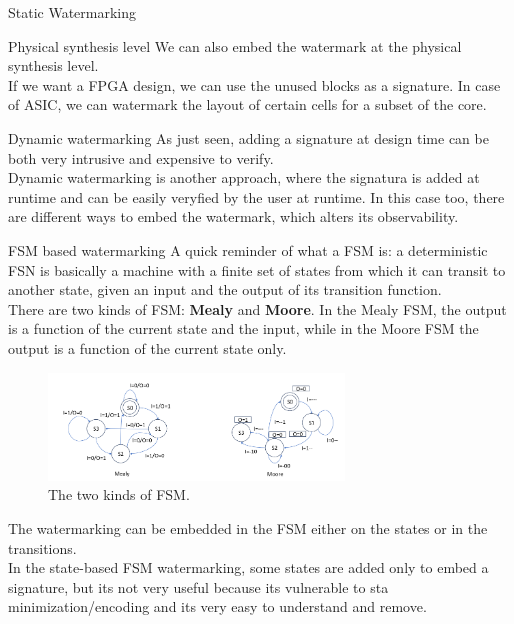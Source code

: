 \begin{section}{Static Watermarking}
  \begin{subsection}{Physical synthesis level}
    We can also embed the watermark at the physical synthesis level.\\
    If we want a FPGA design, we can use the unused blocks as a signature. In case of ASIC, we can watermark
    the layout of certain cells for a subset of the core.
  \end{subsection}
\end{section}

\begin{section}{Dynamic watermarking}
  As just seen, adding a signature at design time can be both very intrusive and expensive to verify.\\
  Dynamic watermarking is another approach, where the signatura is added at runtime and can be easily
  veryfied by the user at runtime. In this case too, there are different ways to embed the watermark,
  which alters its observability.
  \begin{subsection}{FSM based watermarking}
    A quick reminder of what a FSM is: a deterministic FSN is basically a machine with a finite set 
    of states from which it can transit to another state, given an input and the output of its transition
    function.\\
    There are two kinds of FSM: \textbf{Mealy} and \textbf{Moore}. In the Mealy FSM, the output is a
    function of the current state and the input, while in the Moore FSM the output is a function of the
    current state only.\\
    \begin{figure}[h]
      \centering
      \includegraphics[width=0.7\textwidth]{img/hardware/fsm differencew.png}
      \caption{The two kinds of FSM.}
      \label{fig:FSM}
    \end{figure}
    The watermarking can be embedded in the FSM either on the states or in the transitions.\\
    In the state-based FSM watermarking, some states are added only to embed a signature, but its not
    very useful because its vulnerable to sta minimization/encoding and its very easy to understand
    and remove.\\

\end{subsection}
\end{section}
